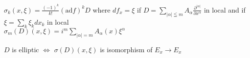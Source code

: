 \begin{Theorem}
\itemprop
  \(\sigma_k(x , \xi) = \frac{(-1)^k}{k !} (\text{ad} f)^k D\) where \(df_x = \xi\)
\itemprop
  if \(D = \sum_{\left| \alpha \right| \leqq m} A_{\alpha} \frac{\partial ^{\left| \alpha \right|}}{\partial x^{\alpha}}\) in local and if \(\xi = \sum_k \xi_k dx_k\) in local \\
  \Then \(\sigma_m(D)(x , \xi) = i^m \sum_{\left| \alpha \right| = m} A_{\alpha}(x)\xi^{\alpha}\)
\end{Theorem}

\begin{Definition}
\itemdefi
  \(D\) is elliptic \(\iff\) \(\sigma(D)(x , \xi)\) is isomorphism of \(E_x \to E_x\)
\end{Definition}